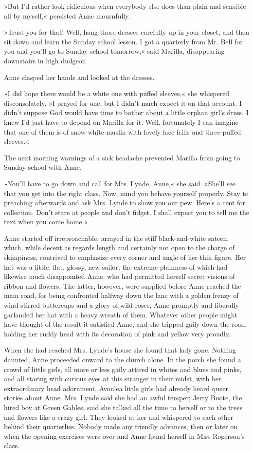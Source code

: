 »But I’d rather look ridiculous when everybody else does than plain and sensible all by myself,« persisted Anne mournfully.

»Trust you for that! Well, hang those dresses carefully up in your closet, and then sit down and learn the Sunday school lesson. I got a quarterly from Mr. Bell for you and you’ll go to Sunday school tomorrow,« said Marilla, disappearing downstairs in high dudgeon.

Anne clasped her hands and looked at the dresses.

»I did hope there would be a white one with puffed sleeves,« she whispered disconsolately. »I prayed for one, but I didn’t much expect it on that account. I didn’t suppose God would have time to bother about a little orphan girl’s dress. I knew I’d just have to depend on Marilla for it. Well, fortunately I can imagine that one of them is of snow-white muslin with lovely lace frills and three-puffed sleeves.«

The next morning warnings of a sick headache prevented Marilla from going to Sunday-school with Anne.

»You’ll have to go down and call for Mrs. Lynde, Anne,« she said. »She’ll see that you get into the right class. Now, mind you behave yourself properly. Stay to preaching afterwards and ask Mrs. Lynde to show you our pew. Here’s a cent for collection. Don’t stare at people and don’t fidget. I shall expect you to tell me the text when you come home.«

Anne started off irreproachable, arrayed in the stiff black-and-white sateen, which, while decent as regards length and certainly not open to the charge of skimpiness, contrived to emphasize every corner and angle of her thin figure. Her hat was a little, flat, glossy, new sailor, the extreme plainness of which had likewise much disappointed Anne, who had permitted herself secret visions of ribbon and flowers. The latter, however, were supplied before Anne reached the main road, for being confronted halfway down the lane with a golden frenzy of wind-stirred buttercups and a glory of wild roses, Anne promptly and liberally garlanded her hat with a heavy wreath of them. Whatever other people might have thought of the result it satisfied Anne, and she tripped gaily down the road, holding her ruddy head with its decoration of pink and yellow very proudly.

When she had reached Mrs. Lynde’s house she found that lady gone. Nothing daunted, Anne proceeded onward to the church alone. In the porch she found a crowd of little girls, all more or less gaily attired in whites and blues and pinks, and all staring with curious eyes at this stranger in their midst, with her extraordinary head adornment. Avonlea little girls had already heard queer stories about Anne. Mrs. Lynde said she had an awful temper; Jerry Buote, the hired boy at Green Gables, said she talked all the time to herself or to the trees and flowers like a crazy girl. They looked at her and whispered to each other behind their quarterlies. Nobody made any friendly advances, then or later on when the opening exercises were over and Anne found herself in Miss Rogerson’s class.

